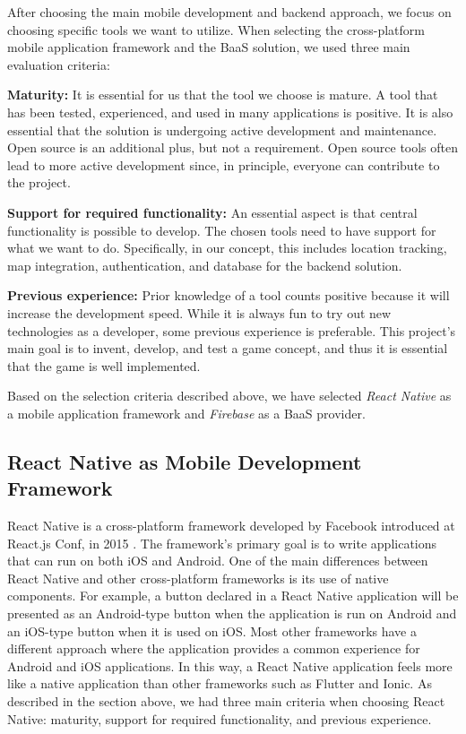 \documentclass[../Main.tex]{subfiles}
\begin{document}
After choosing the main mobile development and backend approach, we focus on choosing specific tools we want to utilize. When selecting the cross-platform mobile application framework and the BaaS solution, we used three main evaluation criteria:

\textbf{Maturity:}
It is essential for us that the tool we choose is mature. A tool that has been tested,  experienced, and used in many applications is positive. It is also essential that the solution is undergoing active development and maintenance. Open source is an additional plus, but not a requirement. Open source tools often lead to more active development since, in principle, everyone can contribute to the project.

\textbf{Support for required functionality:}
An essential aspect is that central functionality is possible to develop. The chosen tools need to have support for what we want to do. Specifically, in our concept, this includes location tracking, map integration, authentication, and database for the backend solution.

\textbf{Previous experience: }
Prior knowledge of a tool counts positive because it will increase the development speed. While it is always fun to try out new technologies as a developer, some previous experience is preferable. This project’s main goal is to invent, develop, and test a game concept, and thus it is essential that the game is well implemented.

Based on the selection criteria described above, we have selected \textit{React Native} as a mobile application framework and \textit{Firebase} as a BaaS provider. 

\subsection{React Native as Mobile Development Framework}
React Native is a cross-platform framework developed by Facebook introduced at React.js Conf, in 2015 \citep{occhino_react_2015}. The framework’s primary goal is to write applications that can run on both iOS and Android. One of the main differences between React Native and other cross-platform frameworks is its use of native components. For example, a button declared in a React Native application will be presented as an Android-type button when the application is run on Android and an iOS-type button when it is used on iOS. Most other frameworks have a different approach where the application provides a common experience for Android and iOS applications. In this way, a React Native application feels more like a native application than other frameworks such as Flutter and Ionic. As described in the section above, we had three main criteria when choosing React Native: maturity, support for required functionality, and previous experience.
\end{document}
